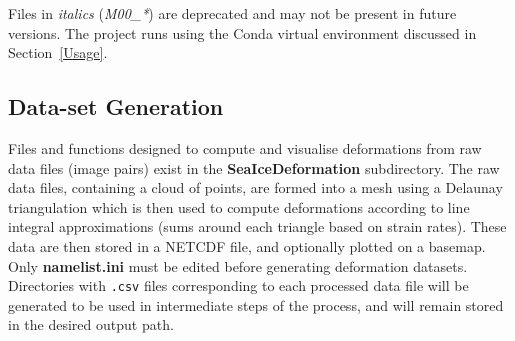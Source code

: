 \documentclass{article}
\begin{document}
    Files in \textit{italics} (\textit{M00\_*}) are deprecated and may not be present in future versions. The project runs using the Conda virtual environment discussed in Section~\ref{Usage}.

    \subsection{Data-set Generation}

        Files and functions designed to compute and visualise deformations from raw data files (image pairs) exist in the \textbf{SeaIceDeformation} subdirectory. The raw data files, containing a cloud of points, are formed into a mesh using a Delaunay triangulation which is then used to compute deformations according to line integral approximations (sums around each triangle based on strain rates). These data are then stored in a NETCDF file, and optionally plotted on a basemap. Only \textbf{namelist.ini} must be edited before generating deformation datasets. Directories with \verb?.csv? files corresponding to each processed data file will be generated to be used in intermediate steps of the process, and will remain stored in the desired output path.
\end{document}
